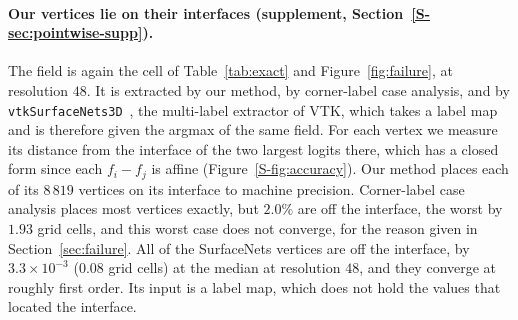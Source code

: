\documentclass{egpubl}
\newcommand{\sref}[1]{\ref*{S-#1}}
\newcommand{\suppp}[1]{supplement, Section~\sref{#1}}
\theoremstyle{definition}
\begin{document}
\paragraph{Our vertices lie on their interfaces
(\suppp{sec:pointwise-supp}).} The field is again the cell of
Table~\ref{tab:exact} and Figure~\ref{fig:failure}, at resolution $48$. It is
extracted by our method, by corner-label case analysis, and by
\texttt{vtkSurfaceNets3D}~\cite{vtk}, the multi-label extractor of VTK,
which takes a label map and is therefore given the argmax of the
same field. For each vertex we measure its distance from the interface of
the two largest logits there, which has a closed form since each $f_i-f_j$ is affine
(Figure~\sref{fig:accuracy}). Our method
places each of its $8\,819$ vertices on its interface to machine precision.
Corner-label case analysis places most vertices exactly, but $2.0\%$ are off
the interface, the worst by $1.93$ grid cells, and this worst case does not
converge, for the reason given in Section~\ref{sec:failure}. All of the
SurfaceNets vertices are off the interface, by $3.3\times10^{-3}$ ($0.08$ grid
cells) at the median at resolution $48$, and they converge at roughly first order. Its input
is a label map, which does not hold the values that located the interface.
\end{document}
